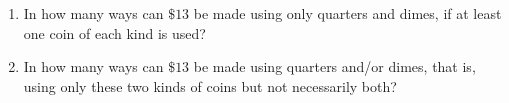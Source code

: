 \begin{enumerate}
\item[(a)] In how many ways can $\$13$ be made using only quarters and dimes, if at least one coin of each kind is used?
\item[(b)] In how many ways can $\$13$ be made using quarters and/or dimes, that is, using only these two kinds of coins but not necessarily both?
\end{enumerate}
